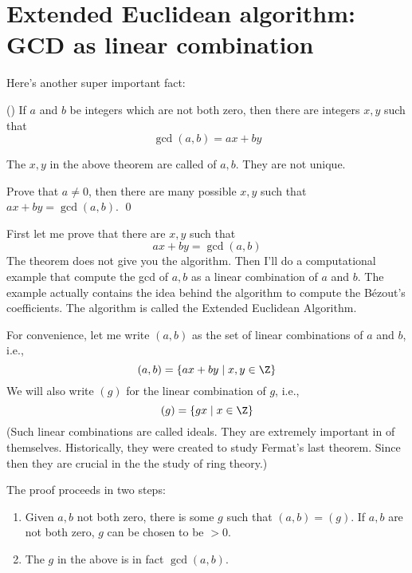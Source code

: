 \section{Extended Euclidean algorithm: GCD as linear combination}

Here's another super important fact:

\begin{thm}
  \textnormal{()}
If $a$ and $b$ be integers which are not both zero,
then there are integers $x,y$ such that
\[
\gcd(a,b) = ax + by
\]
\end{thm}

The $x,y$ in the above theorem are called
of $a,b$.
They are not unique.

\begin{ex}
  Prove that $a \neq 0$, then
  there are many possible $x, y$ such that
  $ax + by = \gcd(a,b)$.
  \qed
\end{ex}


First let me prove that there are $x,y$ such that
\[
ax + by = \gcd(a, b)
\]
The theorem does not give you the algorithm.
Then I'll do a computational example
that compute the gcd of $a,b$ as a linear combination of $a$ and $b$.
The example actually contains the idea behind the algorithm
to compute the B\'ezout's coefficients.
The algorithm is called
the Extended Euclidean Algorithm.

\proof
For convenience, let
me write $(a, b)$ as the set of linear combinations of $a$ and $b$, i.e.,
\[
(a, b) = \{ax + by \mid x,y \in \Z \}
\]
We will also write $(g)$ for the linear combination of $g$, i.e.,
\[
(g) = \{gx \mid x \in \Z \}
\]
(Such linear combinations are called ideals. They are extremely
important in of themselves. Historically, they were created
to study Fermat's last theorem. Since then they are crucial in the
the study of ring theory.)

The proof proceeds in two steps:
\begin{enumerate}[nosep]
\item Given $a,b$ not both zero, there is some $g$ such that
  $(a,b) = (g)$. If $a,b$ are not both zero, $g$ can be chosen to be
  $>0$.
\item The $g$ in the above is in fact $\gcd(a,b)$. 
\end{enumerate}

